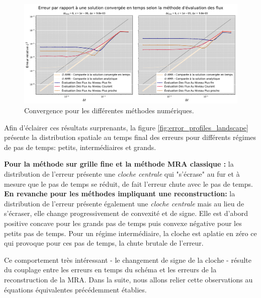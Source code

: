 \begin{figure}[h!]
    \centering
    \includegraphics[width=\textwidth]{media/4_travail/3/flux_reconstruction_method_diffusion.pdf}
    \caption{Convergence pour les différentes méthodes numériques.}
    \label{fig:convergence_diffusion_rok4}
\end{figure}
    Afin d'éclairer ces résultats surprenants, la figure \ref{fig:error_profiles_landscape} présente la distribution spatiale au temps final des erreurs pour différents régimes de pas de temps: petits, intermédiaires et grands.\par
    \textbf{Pour la méthode sur grille fine et la méthode MRA classique :} la distribution de l'erreur présente une \textit{cloche centrale} qui "s'écrase" au fur et à mesure que le pas de temps se réduit, de fait l'erreur chute avec le pas de temps.\\
    \textbf{En revanche pour les méthodes impliquant une reconstruction:} la distribution de l'erreur présente également une \textit{cloche centrale} mais au lieu de s'écraser,
    elle change progressivement de convexité et de signe.
    Elle est d'abord positive concave pour les grands pas de temps puis convexe négative pour les petits pas de temps.
    Pour un régime intermédiaire, la cloche est aplatie en zéro ce qui provoque pour ces pas de temps, la chute brutale de l'erreur.\par
    Ce comportement très intéressant - le changement de signe de la cloche - résulte du couplage entre les erreurs en temps du schéma et les erreurs de la reconstruction de la MRA. 
    Dans la suite, nous allons relier cette observations au équations équivalentes précédemment établies.
\clearpage
